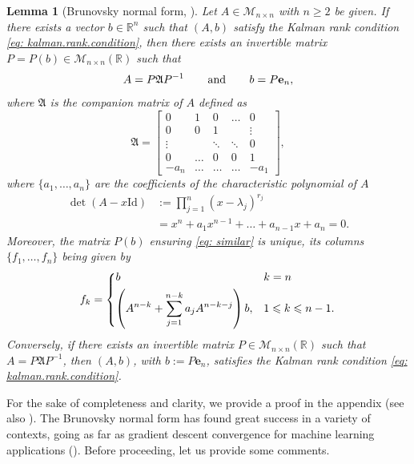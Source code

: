 \documentclass[journal,twoside,web]{ieeecolor}
\newcommand{\R}{\mathbb{R}}
\newtheorem{lemma}{Lemma}
\begin{document}
	
	\begin{lemma}[Brunovsky normal form, \cite{brunovsky1970classification}] \label{lem: brunovski}
	Let $A\in\mathcal{M}_{n\times n}$ with $n\geqslant 2$ be given.
	If there exists a vector $b\in\R^n$ such that $(A,b)$ satisfy the Kalman rank condition \eqref{eq: kalman.rank.condition}, then there exists an invertible matrix $P=P(b)\in\mathcal{M}_{n\times n}(\R)$ 
	such that 
	\begin{equation} \label{eq: similar}
	A=P\mathfrak{A}P^{-1} \hspace{0.5cm} \text{ and } \hspace{0.5cm} b=P\mathbf{e}_n,
	\end{equation}
	where $\mathfrak{A}$ is the companion matrix of $A$ defined as
	\begin{equation} \label{eq: y.system.def}
	\mathfrak{A} = \begin{bmatrix} 0& 1& 0& \ldots& 0 \\ 
						     0& 0& 1& & \vdots \\
						     \vdots&  &\ddots& \ddots& 0 \\
						     0& \ldots& 0 & 0 & 1 \\
						     -a_n& \hdots &\hdots &\hdots & -a_1 
				\end{bmatrix},
	\end{equation}
	where $\{a_1, \ldots, a_n\}$ are the coefficients of the characteristic polynomial of $A$
	\begin{align*}
	\det(A-x\mathrm{Id}) &:= \prod_{j=1}^n (x-\lambda_j)^{r_j} \\
	&= x^n + a_1x^{n-1} + \ldots + a_{n-1} x + a_n= 0.
	\end{align*}
	Moreover, the matrix $P(b)$ ensuring \eqref{eq: similar} is unique, its columns $\{f_1,\ldots,f_n\}$ being given by
	\begin{equation} \label{eq: analy.def.fk}
	f_k = 
	\begin{dcases}
	b & k=n \\
	\left(A^{n-k} + \sum_{j=1}^{n-k} a_{j} A^{n-k-j}\right) b, & 1\leqslant k \leqslant n-1.
	\end{dcases}
	\end{equation}
	Conversely, if there exists an invertible matrix $P\in\mathcal{M}_{n\times n}(\R)$ such that $A=P\mathfrak{A}P^{-1}$, then $(A,b)$, with $b:=P\mathbf{e}_n$, satisfies the Kalman rank condition \eqref{eq: kalman.rank.condition}.
	\end{lemma}
	\medskip
	
	\noindent
	For the sake of completeness and clarity, we provide a proof in the appendix (see also \cite{brunovsky1970classification, trelat2005controle}). The Brunovsky normal form has found great success in a variety of contexts, going as far as  gradient descent convergence for machine learning applications (\cite{hardt2016gradient}). Before proceeding, let us provide some comments.
	\medskip
	
\end{document}
